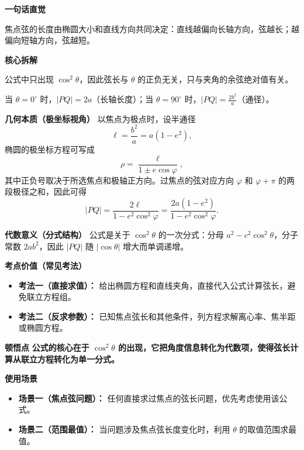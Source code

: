 \begin{explanationbox}

	\textbf{\textcolor{CExplanation}{一句话直觉}}

	焦点弦的长度由椭圆大小和直线方向共同决定：直线越偏向长轴方向，弦越长；越偏向短轴方向，弦越短。

	\medskip

	\textbf{\textcolor{CExplanation}{核心拆解}}
	\begin{description}[style=nextline, leftmargin=2.8em, labelsep=0.5em, itemsep=0.45em]
		\item[\textbf{要点一（参数依赖）：}] 公式中只出现 $\cos^2\theta$，因此弦长与 $\theta$ 的正负无关，只与夹角的余弦绝对值有关。
		\item[\textbf{要点二（特殊取值）：}] 当 $\theta=0^\circ$ 时，$|PQ|=2a$（长轴长度）；当 $\theta=90^\circ$ 时，$|PQ|=\frac{2b^2}{a}$（通径）。
	\end{description}

	\medskip

	\textbf{\textcolor{CExplanation}{几何本质（极坐标视角）}}
	以焦点为极点时，设半通径
	\[
		\ell=\frac{b^2}{a}=a(1-e^2),
	\]
	椭圆的极坐标方程可写成
	\[
		\rho=\frac{\ell}{1\pm e\cos\varphi},
	\]
	其中正负号取决于所选焦点和极轴正方向。过焦点的弦对应方向 $\varphi$ 和 $\varphi+\pi$ 的两段极径之和，因此可得
	\[
		|PQ|=\frac{2\ell}{1-e^2\cos^2\varphi}
		=\frac{2a(1-e^2)}{1-e^2\cos^2\varphi}.
	\]

	\medskip

	\textbf{\textcolor{CExplanation}{代数意义（分式结构）}}
	公式是关于 $\cos^2\theta$ 的一次分式：分母 $a^2-c^2\cos^2\theta$，分子常数 $2ab^2$，因此 $|PQ|$ 随 $|\cos\theta|$ 增大而单调递增。

	\medskip

	\textbf{\textcolor{CExplanation}{考点价值（常见考法）}}
	\begin{itemize}[leftmargin=*, itemsep=0.5em, topsep=0.4em]
		\item \textbf{考法一（直接求值）：} 给出椭圆方程和直线夹角，直接代入公式计算弦长，避免联立方程组。
		\item \textbf{考法二（反求参数）：} 已知焦点弦长和其他条件，列方程求解离心率、焦半距或椭圆方程。
	\end{itemize}

	\medskip

	\textbf{\textcolor{CExplanation}{顿悟点}}
	\textbf{公式的核心在于 $\cos^2\theta$ 的出现，它把角度信息转化为代数项，使得弦长计算从联立方程转化为单一分式。}

	\medskip

	\textbf{\textcolor{CExplanation}{使用场景}}
	\begin{itemize}[leftmargin=*, itemsep=0.5em, topsep=0.4em]
		\item \textbf{场景一（焦点弦问题）：} 任何直接求过焦点的弦长问题，优先考虑使用该公式。
		\item \textbf{场景二（范围最值）：} 当问题涉及焦点弦长度变化时，利用 $\theta$ 的取值范围求最值。
	\end{itemize}

\end{explanationbox}